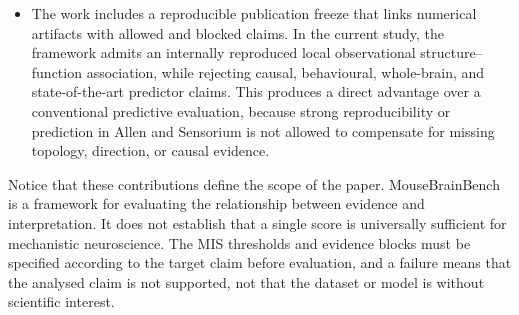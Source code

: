 \begin{itemize}
  \item The work includes a reproducible publication freeze that links numerical
  artifacts with allowed and blocked claims. In the current study, the framework
  admits an internally reproduced local observational structure--function association, while
  rejecting causal, behavioural, whole-brain, and state-of-the-art predictor
  claims. This produces a direct advantage over a conventional predictive
  evaluation, because strong reproducibility or prediction in Allen and Sensorium
  is not allowed to compensate for missing topology, direction, or causal
  evidence.
\end{itemize}

Notice that these contributions define the scope of the paper. MouseBrainBench
is a framework for evaluating the relationship between evidence and
interpretation. It does not establish that a single score is universally
sufficient for mechanistic neuroscience. The MIS thresholds and evidence blocks
must be specified according to the target claim before evaluation, and a failure
means that the analysed claim is not supported, not that the dataset or model is
without scientific interest.
